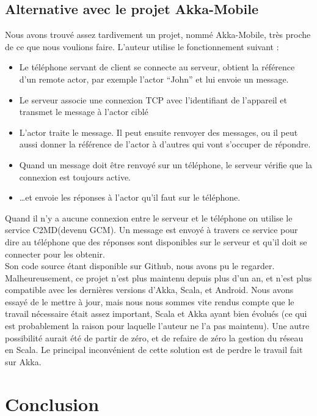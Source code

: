 \documentclass[a4paper,12pt]{article}
\begin{document}
\subsection{Alternative avec le projet Akka-Mobile}
Nous avons trouvé assez tardivement un projet, nommé Akka-Mobile, très proche
de ce que nous voulions faire. L’auteur utilise le fonctionnement suivant :\\
\begin{itemize}
\item Le téléphone servant de client se connecte au serveur, obtient la
  référence d’un remote actor, par exemple l’actor “John” et lui envoie un
  message.\\
\item Le serveur associe une connexion TCP avec l’identifiant de l’appareil et
  transmet le message à l’actor ciblé\\
\item L’actor traite le message. Il peut ensuite renvoyer des messages, ou il
  peut aussi donner la référence de l’actor à d’autres qui vont s’occuper de
  répondre.\\
\item Quand un message doit être renvoyé sur un téléphone, le serveur vérifie
  que la connexion est toujours active.\\
\item …et envoie les réponses à l’actor qu’il faut sur le téléphone.\\
\end{itemize}
Quand il n’y a aucune connexion entre le serveur et le téléphone on utilise le
service C2MD(devenu GCM). Un message est envoyé à travers ce service pour dire
au téléphone que des réponses sont disponibles sur le serveur et qu’il doit se
connecter pour les obtenir.\\

Son code source étant disponible sur Github, nous avons pu le
regarder. Malheureusement, ce projet n’est plus maintenu depuis plus d’un an,
et n’est plus compatible avec les dernières versions d’Akka, Scala, et
Android. Nous avons essayé de le mettre à jour, mais nous nous sommes vite
rendus compte que le travail nécessaire était assez important, Scala et Akka
ayant bien évolués (ce qui est probablement la raison pour laquelle l’auteur ne
l’a pas maintenu).  Une autre possibilité aurait été de partir de zéro, et de
refaire de zéro la gestion du réseau en Scala. Le principal inconvénient de
cette solution est de perdre le travail fait sur Akka.



\newpage


\section*{Conclusion}
\end{document}
